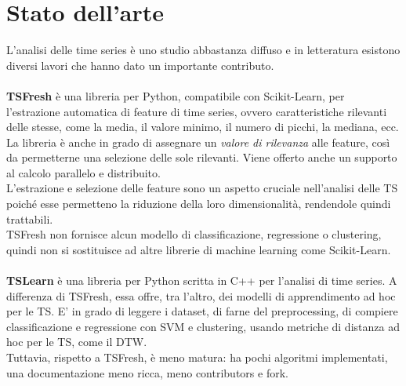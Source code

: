 \section{Stato dell'arte}
L'analisi delle time series è uno studio abbastanza diffuso e in letteratura esistono diversi lavori che hanno dato un importante contributo.\\
\\
\textbf{TSFresh}\cite{tsfresh} è una libreria per Python, compatibile con Scikit-Learn, per l'estrazione automatica di feature di time series, ovvero caratteristiche rilevanti delle stesse, come la media, il valore minimo, il numero di picchi, la mediana, ecc. La libreria è anche in grado di assegnare un \textit{valore di rilevanza} alle feature, così da permetterne una selezione delle sole rilevanti. Viene offerto anche un supporto al calcolo parallelo e distribuito.\\
L'estrazione e selezione delle feature sono un aspetto cruciale nell'analisi delle TS poiché esse permetteno la riduzione della loro dimensionalità, rendendole quindi trattabili.\\
TSFresh non fornisce alcun modello di classificazione, regressione o clustering, quindi non si sostituisce ad altre librerie di machine learning come Scikit-Learn.\\
\\
\textbf{TSLearn}\cite{tslearn} è una libreria per Python scritta in C++ per l'analisi di time series. A differenza di TSFresh, essa offre, tra l'altro, dei modelli di apprendimento ad hoc per le TS. E' in grado di leggere i dataset, di farne del preprocessing, di compiere classificazione e regressione con SVM e clustering, usando metriche di distanza ad hoc per le TS, come il DTW.\\
Tuttavia, rispetto a TSFresh, è meno matura: ha pochi algoritmi implementati, una documentazione meno ricca, meno contributors e fork.

